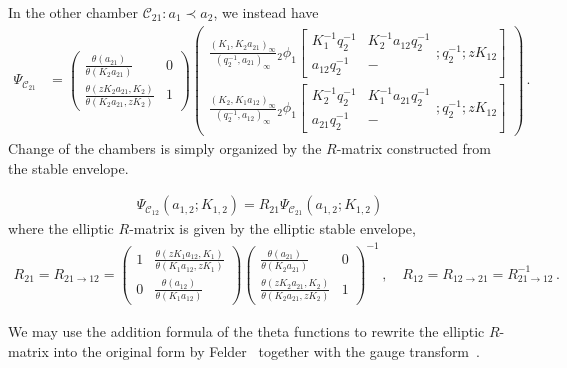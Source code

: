 In the other chamber $\mathscr{C}_{21} : a_1 \prec a_2$, we instead have
\begin{align}
    \Psi_{\mathscr{C}_{21}} 
    & = 
    \begin{pmatrix}
            \displaystyle \frac{\theta(a_{21}) }{\theta(K_2 a_{21}) } & 0 \\
            \displaystyle \frac{\theta(z K_2 a_{21},K_2)}{\theta(K_2 a_{21},z K_2) } & 1
    \end{pmatrix}
    \begin{pmatrix}
        \displaystyle \frac{(K_1,K_2 a_{21})_\infty}{(q_2^{-1},a_{21})_\infty} {_2\phi_1}\left[ 
    \begin{matrix}
        K_1^{-1}q_2^{-1} & K_2^{-1} a_{12} q_2^{-1} \\ a_{12} q_2^{-1} & -
    \end{matrix} ; q_2^{-1}; z K_{12} \right]
    \\[1.5em] \displaystyle
    \frac{(K_2,K_1 a_{12})_\infty}{(q_2^{-1},a_{12})_\infty} {_2\phi_1}\left[ 
    \begin{matrix}
        K_2^{-1}q_2^{-1} & K_1^{-1} a_{21} q_2^{-1} \\ a_{21} q_2^{-1} & -
    \end{matrix} ; q_2^{-1}; z K_{12} \right]
    \end{pmatrix}
    \, .
\end{align}
Change of the chambers is simply organized by the $R$-matrix constructed from the stable envelope.
\begin{proposition}\label{prop:R-matrix}
    \begin{align}
        \Psi_{\mathscr{C}_{12}}(a_{1,2};K_{1,2}) = R_{21} \Psi_{\mathscr{C}_{21}}(a_{1,2};K_{1,2})
    \end{align}
    where the elliptic $R$-matrix is given by the elliptic stable envelope, 
    \begin{align}
        R_{21} = R_{21 \to 12} = 
        \begin{pmatrix}
            1 & \displaystyle \frac{\theta(z K_1 a_{12},K_1)}{\theta(K_1 a_{12},z K_1) } \\ 
            0 & \displaystyle \frac{\theta(a_{12}) }{\theta(K_1 a_{12}) }
        \end{pmatrix}
        \begin{pmatrix}
            \displaystyle \frac{\theta(a_{21}) }{\theta(K_2 a_{21}) } & 0 \\
            \displaystyle \frac{\theta(z K_2 a_{21},K_2)}{\theta(K_2 a_{21},z K_2) } & 1
        \end{pmatrix}^{-1}
        \, , \quad 
        R_{12} = R_{12 \to 21} = R_{21 \to 12}^{-1} \, .
    \end{align}
\end{proposition}
We may use the addition formula of the theta functions to rewrite the elliptic $R$-matrix into the original form by Felder~\cite{Felder:1994pb,Felder:1994be} together with the gauge transform~\cite{Aganagic:2016jmx}.

